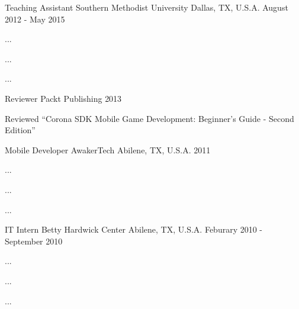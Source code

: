 

\begin{cventries}

  \cventry
    {Teaching Assistant} %
    {Southern Methodist University} %
    {Dallas, TX, U.S.A.} %
    {August 2012 - May 2015} %
    {
      \begin{cvitems} %
        \item {...}
        \item {...}
        \item {...}
      \end{cvitems}
    }

  \cventry
    {Reviewer} %
    {Packt Publishing} %
    {} %
    {2013} %
    {
      \begin{cvitems} %
        \item {Reviewed ``Corona SDK Mobile Game Development: Beginner's Guide - Second Edition''}
      \end{cvitems}
    }

  \cventry
    {Mobile Developer} %
    {AwakerTech} %
    {Abilene, TX, U.S.A.} %
    {2011} %
    {
      \begin{cvitems} %
        \item {...}
        \item {...}
        \item {...}
      \end{cvitems}
    }

  \cventry
    {IT Intern} %
    {Betty Hardwick Center} %
    {Abilene, TX, U.S.A.} %
    {Feburary 2010 - September 2010} %
    {
      \begin{cvitems} %
        \item {...}
        \item {...}
        \item {...}
      \end{cvitems}
    }


\end{cventries}

